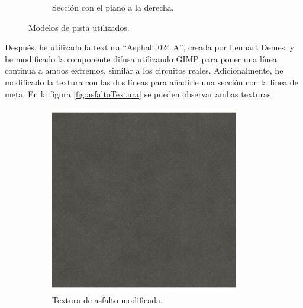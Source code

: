 \begin{figure}[H]
\begin{subfigure}[t]{0.48\textwidth}
        \caption{Sección con el piano a la derecha.}
        \label{fig:curvaR}
    \end{subfigure}
    \caption{Modelos de pista utilizados.}
    \label{fig:curvasmodelos}
\end{figure}

Después, he utilizado la textura ``Asphalt 024 A''\cite{asphalt}, creada por Lennart Demes, y he modificado la componente difusa utilizando GIMP para poner una línea continua a ambos extremos, similar a los circuitos reales. Adicionalmente, he modificado la textura con las dos líneas para añadirle una sección con la línea de meta. En la figura \ref{fig:asfaltoTextura} se pueden observar ambas texturas.

\begin{figure}[H]
    \centering 
	\begin{subfigure}[t]{0.48\textwidth}
	    \centering
        \includegraphics[width=0.9\textwidth,cframe=black 1pt 0pt]{imagenes/converted/pista/Asphalt024A_2K_Color.jpg}
        \caption{Textura de asfalto modificada.}
        \label{fig:asfaltomod}
    \end{subfigure}
    \hfill 
	\begin{subfigure}[t]{0.48\textwidth}

\end{subfigure}
\end{figure}
